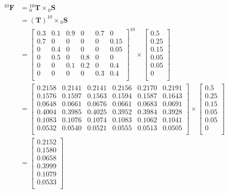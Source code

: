 \documentclass[a4paper,10pt]{article}
\newcommand{\matst}[1]{\ensuremath{{_{#1}}{\mathbf{S}}}}
\newcommand{\matfin}[1]{\ensuremath{{^{#1}}{\mathbf{F}}}}
\newcommand{\mattrans}[2]{{\ensuremath{{_{#1}^{#2}}{\mathbf{T}}}}}
\begin{document}
\begin{equation*}
\begin{split}
\matfin{10} &= \mattrans{0}{10}\times\matst{0}\\
&= \left(\mathbf{T}\right)^{10}\times\matst{0}\\
&= {\left[\begin{array}{cccccc}
0.3 & 0.1 & 0.9 & 0 & 0.7 & 0 \\
0.7 & 0 & 0 & 0 & 0 & 0.15 \\
0 & 0.4 & 0 & 0 & 0 & 0.05 \\
0 & 0.5 & 0 & 0.8 & 0 & 0 \\
0 & 0 & 0.1 & 0.2 & 0 & 0.4 \\
0 & 0 & 0 & 0 & 0.3 & 0.4 \\
\end{array}\right]}^{10}\times
\left[\begin{array}{c} 0.5 \\ 0.25 \\ 0.15 \\ 0.05 \\ 0.05 \\ 0\\\end{array}\right]\\
&= \left[\begin{array}{cccccc}
0.2158 & 0.2141 & 0.2141 & 0.2156 & 0.2170 & 0.2191\\
0.1576 & 0.1597 & 0.1563 & 0.1594 & 0.1587 & 0.1643\\
0.0648 & 0.0661 & 0.0676 & 0.0661 & 0.0683 & 0.0691\\
0.4004 & 0.3985 & 0.4025 & 0.3952 & 0.3984 & 0.3928\\
0.1083 & 0.1076 & 0.1074 & 0.1083 & 0.1062 & 0.1041\\
0.0532 & 0.0540 & 0.0521 & 0.0555 & 0.0513 & 0.0505\\
\end{array}\right]\times
\left[\begin{array}{c} 0.5 \\ 0.25 \\ 0.15 \\ 0.05 \\ 0.05 \\ 0\\\end{array}\right]\\
&= \boxed{\left[\begin{array}{c}
0.2152\\
0.1580\\
0.0658\\
0.3999\\
0.1079\\
0.0533\\
\end{array}\right]}
\end{split} 
\end{equation*}
\end{document}
